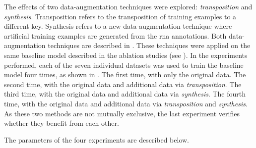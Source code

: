 
The effects of two data-augmentation techniques were
explored: \emph{transposition} and \emph{synthesis}.
Transposition refers to the transposition of training
examples to a different key. Synthesis refers to a new
data-augmentation technique where artificial training
examples are generated from the \gls{rna} annotations. Both
data-augmentation techniques are described in
. These techniques were applied on
the same baseline model described in the ablation studies
(see ). In the experiments
performed, each of the seven individual datasets was used to
train the baseline model four times, as shown in
. The first time, with only
the original data. The second time, with the original data
and additional data via \emph{transposition}. The third
time, with the original data and additional data via
\emph{synthesis}. The fourth time, with the original data
and additional data via \emph{transposition} and
\emph{synthesis}. As these two methods are not mutually
exclusive, the last experiment verifies whether they benefit
from each other.


The parameters of the four experiments are described below.
